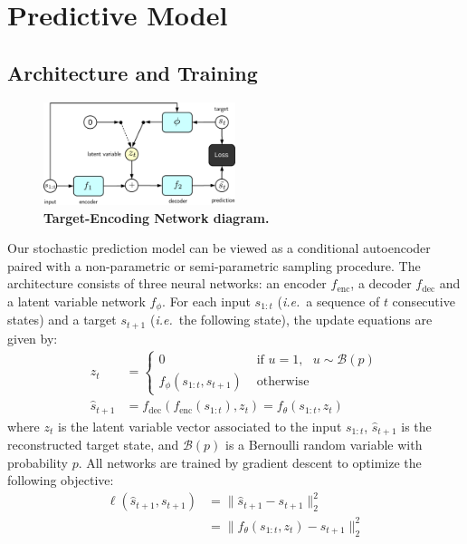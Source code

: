 \documentclass{article}
\begin{document}
\section{Predictive Model}

\subsection{Architecture and Training}

\begin{figure}
  \centering
  \includegraphics[width=0.5\textwidth]{images/ae_train-crop.pdf}
  \caption{
    \textbf{Target-Encoding Network diagram.}
  }
\end{figure}

Our stochastic prediction model can be viewed as a conditional autoencoder paired with a non-parametric  or semi-parametric sampling procedure.
The architecture consists of three neural networks: an encoder $f_\text{enc}$, a decoder $f_\text{dec}$ and a latent variable network $f_\phi$.
For each input $s_{1:t}$ (\emph{i.e.}\ a sequence of $t$ consecutive states) and a target $s_{t+1}$ (\emph{i.e.}\ the following state), the update equations are given by:
%
\begin{align}
  \label{eq:update-eqn}
  z_t &=
  \begin{cases}
    0 & \mbox{   if   } u = 1, \mbox{   } u \sim \mathcal{B}(p) \\
    f_\phi(s_{1:t}, s_{t+1}) & \mbox{   otherwise}
  \end{cases} \\
  \hat{s}_{t+1} &= f_\text{dec}(f_\text{enc}(s_{1:t}), z_t) = f_\theta(s_{1:t}, z_t)
\end{align}
%
where $z_t$ is the latent variable vector associated to the input $s_{1:t}$, $\hat{s}_{t + 1}$ is the reconstructed target state, and $\mathcal{B}(p)$ is a Bernoulli random variable with probability $p$.
All networks are trained by gradient descent to optimize the following objective:
%
\begin{align}
  \ell(\hat{s}_{t+1}, s_{t+1}) &= \lVert \hat{s}_{t+1} - s_{t+1} \rVert_2^2 \\
  &= \lVert f_\theta(s_{1:t}, z_t) - s_{t+1} \rVert_2^2
\end{align}
\end{document}
